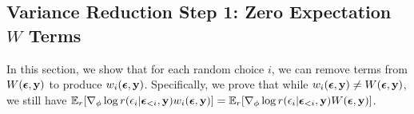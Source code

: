\subsection{Variance Reduction Step 1: Zero Expectation $W$ Terms}

In this section, we show that for each random choice $i$, we can remove terms from $W(\bm{\epsilon}, \mathbf{y})$ to produce $w_i(\bm{\epsilon}, \mathbf{y})$. Specifically, we prove that while $w_i(\bm{\epsilon}, \mathbf{y}) \neq W(\bm{\epsilon}, \mathbf{y})$, we still have $\mathbb{E}_{r} [ \nabla_\phi \log r(\epsilon_i | \bm{\epsilon}_{<i}, \mathbf{y}) w_i(\bm{\epsilon}, \mathbf{y}) ] = \mathbb{E}_{r} [ \nabla_\phi \log r(\epsilon_i | \bm{\epsilon}_{<i}, \mathbf{y}) W(\bm{\epsilon}, \mathbf{y}) ]$.

